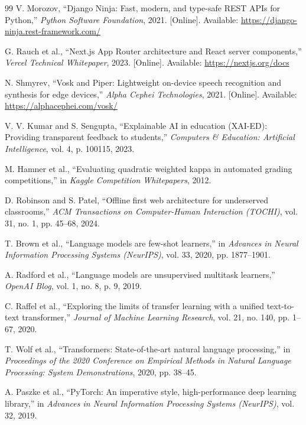 \begin{thebibliography}{99}
V. Morozov, ``Django Ninja: Fast, modern, and type-safe REST APIs for Python,'' \textit{Python Software Foundation}, 2021. [Online]. Available: \url{https://django-ninja.rest-framework.com/}

G. Rauch et al., ``Next.js App Router architecture and React server components,'' \textit{Vercel Technical Whitepaper}, 2023. [Online]. Available: \url{https://nextjs.org/docs}

N. Shmyrev, ``Vosk and Piper: Lightweight on-device speech recognition and synthesis for edge devices,'' \textit{Alpha Cephei Technologies}, 2021. [Online]. Available: \url{https://alphacephei.com/vosk/}

V. V. Kumar and S. Sengupta, ``Explainable AI in education (XAI-ED): Providing transparent feedback to students,'' \textit{Computers \& Education: Artificial Intelligence}, vol. 4, p. 100115, 2023.

M. Hamner et al., ``Evaluating quadratic weighted kappa in automated grading competitions,'' in \textit{Kaggle Competition Whitepapers}, 2012.

D. Robinson and S. Patel, ``Offline first web architecture for underserved classrooms,'' \textit{ACM Transactions on Computer-Human Interaction (TOCHI)}, vol. 31, no. 1, pp. 45--68, 2024.

T. Brown et al., ``Language models are few-shot learners,'' in \textit{Advances in Neural Information Processing Systems (NeurIPS)}, vol. 33, 2020, pp. 1877--1901.

A. Radford et al., ``Language models are unsupervised multitask learners,'' \textit{OpenAI Blog}, vol. 1, no. 8, p. 9, 2019.

C. Raffel et al., ``Exploring the limits of transfer learning with a unified text-to-text transformer,'' \textit{Journal of Machine Learning Research}, vol. 21, no. 140, pp. 1--67, 2020.

T. Wolf et al., ``Transformers: State-of-the-art natural language processing,'' in \textit{Proceedings of the 2020 Conference on Empirical Methods in Natural Language Processing: System Demonstrations}, 2020, pp. 38--45.

A. Paszke et al., ``PyTorch: An imperative style, high-performance deep learning library,'' in \textit{Advances in Neural Information Processing Systems (NeurIPS)}, vol. 32, 2019.


\end{thebibliography}
